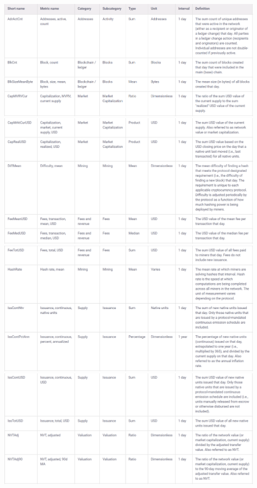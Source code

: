 \documentclass[
]{book}
\begin{document}
\includegraphics{images/coinmetrics_datadictionary1.png}
\includegraphics{images/coinmetrics_datadictionary2.png}
\includegraphics{images/coinmetrics_datadictionary3.png}
\includegraphics{images/coinmetrics_datadictionary4.png}
\end{document}
